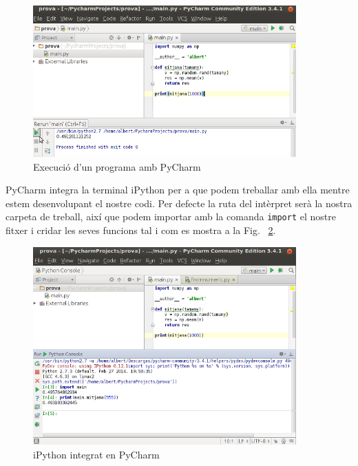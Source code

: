 \begin{figure}[!h]
    \begin{centering}
    \includegraphics[width=0.9\textwidth]{img/run.png}
    \caption{Execució d'un programa amb PyCharm}
    \label{fig:run}
    \end{centering}
\end{figure}




PyCharm integra la terminal iPython per a que podem treballar amb ella mentre estem desenvolupant el nostre codi. Per defecte la ruta del intèrpret serà la nostra carpeta de treball, així que podem importar amb la comanda {\tt import} el nostre fitxer i cridar les seves funcions tal i com es mostra a la Fig. ~\ref{fig:icharm}.


\begin{figure}[!h]
    \begin{centering}
    \includegraphics[width=0.9\textwidth]{img/icharm.png}
    \caption{iPython integrat en PyCharm}
    \label{fig:icharm}
    \end{centering}
\end{figure}






